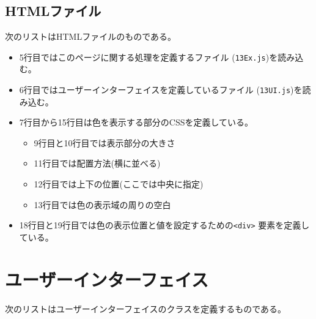 \subsection{HTMLファイル}
次のリストはHTMLファイルのものである。
\begin{itemize}
 \item 5行目ではこのページに関する処理を定義する\JS ファイル
       (\texttt{13Ex.js})を読み込む。
 \item 6行目ではユーザーインターフェイスを定義している\JS ファイル
       (\texttt{13UI.js})を読み込む。
 \item 7行目から15行目は色を表示する部分のCSSを定義している。
       \begin{itemize}
        \item 9行目と10行目では表示部分の大きさ
        \item 11行目では配置方法(横に並べる)
        \item 12行目では上下の位置(ここでは中央に指定)
        \item 13行目では色の表示域の周りの空白
       \end{itemize}
 \item 18行目と19行目では色の表示位置と値を設定するための\texttt{<div>}
       要素を定義している。
\end{itemize}
 \section{ユーザーインターフェイス}
 次のリストはユーザーインターフェイスのクラスを定義するものである。

